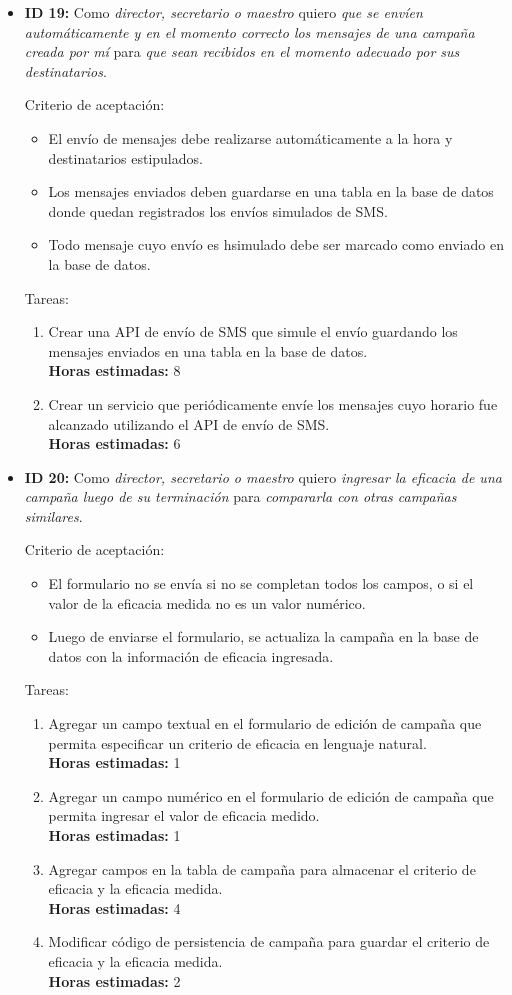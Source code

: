 \documentclass[a4paper, 10pt, twoside]{article}
\newenvironment{stories}{
  \begin{itemize}
}{
  \end{itemize}
}
\newcommand{\storyid}[4]{
  \item
  \textbf{ID #1:} Como \emph{#2} quiero \emph{#3} para \emph{#4}.
}
\newenvironment{tasks}{
  Tareas:
  \begin{enumerate}
}{
  \end{enumerate}
}
\newcommand{\task}[1] {
  \item #1.\\
  \textbf{Horas estimadas:}
}
\newenvironment{criterios}{
  Criterio de aceptación:
  \begin{itemize}
}{
  \end{itemize}
}
\newcommand{\criteria}[1] {
  \item #1
}
\begin{document}
\begin{stories}
  \begin{tasks}
    \task{Crear una interfaz que liste todas las campañas creadas por el usuario actual} 3
    \task{Crear interacción que muestre el formulario de edición de la campaña cuando se la selecciona en la lista anterior} 2
    \task{Modificar formulario de edición de campaña y sus componentes para que tenga precargados los datos de una campaña existente y permita modificarla} 0.5
    \task{Modificar código de persistencia de campañas para que permita guardar cambios en una campaña existente} 0.5
  \end{tasks}


  \storyid{19}{director, secretario o maestro}
              {que se envíen automáticamente y en el momento correcto los mensajes de una campaña creada por mí}
              {que sean recibidos en el momento adecuado por sus destinatarios}

   \begin{criterios}
    \criteria{El envío de mensajes debe realizarse automáticamente a la hora y destinatarios estipulados.}
    \criteria{Los mensajes enviados deben guardarse en una tabla en la base de datos donde quedan registrados los envíos simulados de SMS.}
    \criteria{Todo mensaje cuyo envío es hsimulado debe ser marcado como enviado en la base de datos.}
  \end{criterios}

  \begin{tasks}
    \task{Crear una API de envío de SMS que simule el envío guardando los mensajes enviados en una tabla en la base de datos} 8
    \task{Crear un servicio que periódicamente envíe los mensajes cuyo horario fue alcanzado utilizando el API de envío de SMS} 6
  \end{tasks}


  \storyid{20}{director, secretario o maestro}
              {ingresar la eficacia de una campaña luego de su terminación}
              {compararla con otras campañas similares}

  \begin{criterios}
    \criteria{El formulario no se envía si no se completan todos los campos, o si el valor de la eficacia medida no es un valor numérico.}
    \criteria{Luego de enviarse el formulario, se actualiza la campaña en la base de datos con la información de eficacia ingresada.}
  \end{criterios}

  \begin{tasks}
    \task{Agregar un campo textual en el formulario de edición de campaña que permita especificar un criterio de eficacia en lenguaje natural} 1
    \task{Agregar un campo numérico en el formulario de edición de campaña que permita ingresar el valor de eficacia medido} 1
    \task{Agregar campos en la tabla de campaña para almacenar el criterio de eficacia y la eficacia medida} 4
    \task{Modificar código de persistencia de campaña para guardar el criterio de eficacia y la eficacia medida} 2
  \end{tasks}
\end{stories}
\end{document}
